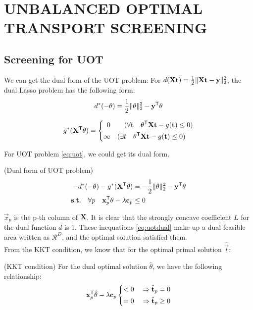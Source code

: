 \section{UNBALANCED OPTIMAL TRANSPORT SCREENING}
\subsection{Screening for UOT}

We can get the dual form of the UOT problem: 
For $d(\mathbf{X} \mathbf{t}) = \frac{1}{2}\|\mathbf{X} \mathbf{t}-\mathbf{y}\|_2^2$, the dual Lasso problem has the following form:
 \begin{equation}
\begin{split} 
d^*(-\theta) = \frac{1}{2}\|\theta\|_2^2-\mathbf{y}^{\mathsf T}\theta
 \end{split}
\end{equation}

 \begin{equation}
\begin{split} 
g^*(\mathbf{X}^{\mathsf T}\theta) = \left\{
\begin{aligned}
0 \quad&\quad ( \forall \mathbf{t} \quad\theta^{\mathsf T}\mathbf{X}\mathbf{t} - g(\mathbf{t}) \leq 0 )\\
\infty \quad&( \exists t \quad\theta^{\mathsf T}\mathbf{X}\mathbf{t} - g(\mathbf{t}) \leq 0 )
\end{aligned}
\right.
 \end{split}
\end{equation}

For UOT problem \ref{eq:uot}, we could get its dual form. 
\begin{lem}(Dual form of UOT problem)
\begin{equation}
\begin{split}
-d^*(-\theta) - g^*(\mathbf{X}^{\mathsf T}\theta)& = -\frac{1}{2}\|\theta\|_2^2-\mathbf{y}^{\mathsf T}\theta \\
 \mathbf{s.t.} \quad \forall p \quad \mathbf{x}_p^{\mathsf T}\theta -\lambda \mathbf{c}_p &\leq 0
 \end{split}
 \label{eq:uotdual}
\end{equation}
\end{lem}
$\vec{x}_p $ is the p-th column of $\mathbf{X}$, It is clear that the strongly concave coefficient $L$ for the dual function $d$ is 1. These inequations \ref{eq:uotdual} make up a dual feasible area written as $\mathcal{R}^{D}$, and the optimal solution satisfied them.\\
From the KKT condition, we know that for the optimal primal solution $\hat{\vec{t}}$:
\begin{thm} (KKT condition) For the dual optimal solution $\hat{\theta}$, we have the following relationship:
 \begin{equation}
\begin{split}
\mathbf{x}_p^{\mathsf T}\hat{\theta} -\lambda \mathbf{c}_p \left\{
\begin{aligned}
< 0 \quad& \Rightarrow \hat{\mathbf{t}}_p = 0\\
= 0 \quad& \Rightarrow \hat{\mathbf{t}}_p \geq 0
\end{aligned}
\right.
 \end{split}
 \label{eq:kkt}
\end{equation}
\end{thm}

